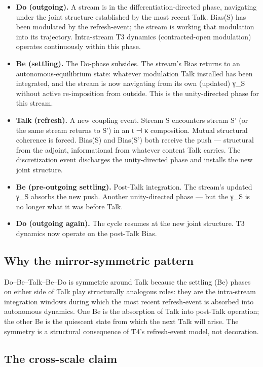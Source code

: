 \documentclass[11pt, openany]{book}
\begin{document}
\begin{itemize}
\item \textbf{Do (outgoing).} A stream is in the differentiation-directed phase, navigating under the joint structure established by the most recent Talk. Bias(S) has been modulated by the refresh-event; the stream is working that modulation into its trajectory. Intra-stream T3 dynamics (contracted-open modulation) operates continuously within this phase.
\item \textbf{Be (settling).} The Do-phase subsides. The stream's Bias returns to an autonomous-equilibrium state: whatever modulation Talk installed has been integrated, and the stream is now navigating from its own (updated) γ\_\allowbreak{}S without active re-imposition from outside. This is the unity-directed phase for this stream.
\item \textbf{Talk (refresh).} A new coupling event. Stream S encounters stream S' (or the same stream returns to S') in an ι ⊣ κ composition. Mutual structural coherence is forced. Bias(S) and Bias(S') both receive the push --- structural from the adjoint, informational from whatever content Talk carries. The discretization event discharges the unity-directed phase and installs the new joint structure.
\item \textbf{Be (pre-outgoing settling).} Post-Talk integration. The stream's updated γ\_\allowbreak{}S absorbs the new push. Another unity-directed phase --- but the γ\_\allowbreak{}S is no longer what it was before Talk.
\item \textbf{Do (outgoing again).} The cycle resumes at the new joint structure. T3 dynamics now operate on the post-Talk Bias.
\end{itemize}

\subsection{Why the mirror-symmetric pattern}

Do–Be–Talk–Be–Do is symmetric around Talk because the settling (Be) phases on either side of Talk play structurally analogous roles: they are the intra-stream integration windows during which the most recent refresh-event is absorbed into autonomous dynamics. One Be is the absorption of Talk into post-Talk operation; the other Be is the quiescent state from which the next Talk will arise. The symmetry is a structural consequence of T4's refresh-event model, not decoration.

\subsection{The cross-scale claim}
\end{document}
